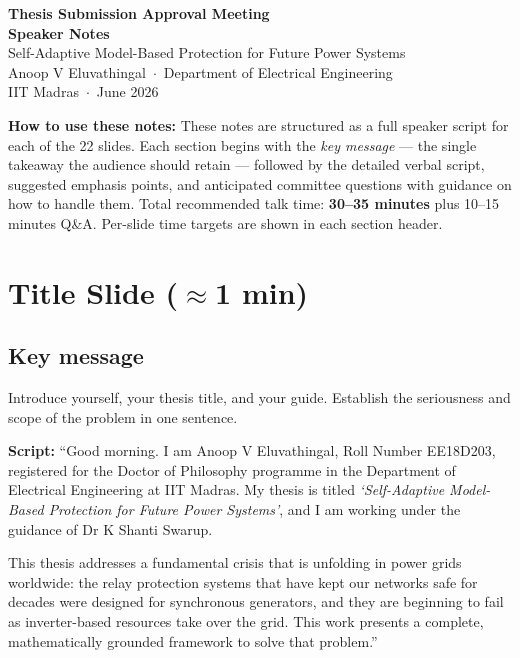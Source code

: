 \documentclass[11pt,a4paper]{article}
\newcommand{\script}[1]{\begin{scriptbox}\textbf{Script:} #1\end{scriptbox}}
\begin{document}
\begin{center}
  {\LARGE\bfseries\color{iitmnavy}
    Thesis Submission Approval Meeting\\[6pt]
    Speaker Notes}
  \vspace{6pt}\\
  {\large Self-Adaptive Model-Based Protection for Future Power Systems}\\[4pt]
  {\normalsize Anoop V Eluvathingal\ $\cdot$\ Department of Electrical Engineering\\
    IIT Madras\ $\cdot$\ June 2026}
\end{center}

\medskip
\begin{mdframed}[backgroundcolor=notesbg, linecolor=iitmnavy, linewidth=1pt,
  innertopmargin=8pt, innerbottommargin=8pt, innerleftmargin=10pt]
\textbf{How to use these notes:}
These notes are structured as a full speaker script for each of the 22 slides.
Each section begins with the \textit{key message} — the single takeaway the
audience should retain — followed by the detailed verbal script, suggested
emphasis points, and anticipated committee questions with guidance on how to
handle them.
Total recommended talk time: \textbf{30--35 minutes} plus 10--15 minutes Q\&A.
Per-slide time targets are shown in each section header.
\end{mdframed}

\tableofcontents
\clearpage

\section{Title Slide \hfill\normalfont\small($\approx$1 min)}
\label{slide:title}

\subsection*{Key message}
Introduce yourself, your thesis title, and your guide.
Establish the seriousness and scope of the problem in one sentence.

\script{%
``Good morning. I am Anoop V Eluvathingal, Roll Number EE18D203, registered for the
Doctor of Philosophy programme in the Department of Electrical Engineering at IIT Madras.
My thesis is titled \textit{`Self-Adaptive Model-Based Protection for Future Power
Systems'}, and I am working under the guidance of Dr K Shanti Swarup.

This thesis addresses a fundamental crisis that is unfolding in power grids worldwide:
the relay protection systems that have kept our networks safe for decades were designed for
synchronous generators, and they are beginning to fail as inverter-based resources take
over the grid. This work presents a complete, mathematically grounded framework to solve
that problem.''%
}
\end{document}
